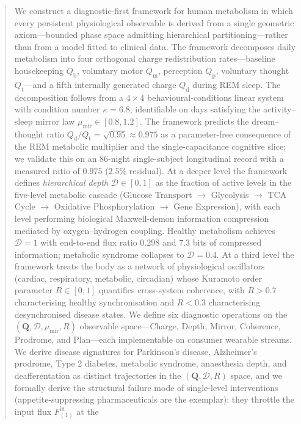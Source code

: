 \documentclass[11pt,twocolumn,a4paper]{article}
\theoremstyle{definition}
\theoremstyle{remark}
\newcommand{\Qb}{Q_{\mathrm{b}}}
\newcommand{\Qm}{Q_{\mathrm{m}}}
\newcommand{\Qp}{Q_{\mathrm{p}}}
\newcommand{\Qt}{Q_{\mathrm{t}}}
\newcommand{\Qd}{Q_{\mathrm{d}}}
\newcommand{\Dhier}{\mathcal{D}}
\newcommand{\Rcoh}{R}
\newcommand{\munir}{\mu_{\mathrm{mir}}}
\begin{document}
\begin{abstract}
We construct a diagnostic-first framework for human metabolism in which
every persistent physiological observable is derived from a single
geometric axiom---bounded phase space admitting hierarchical
partitioning---rather than from a model fitted to clinical data. The
framework decomposes daily metabolism into four orthogonal charge
redistribution rates---baseline housekeeping $\Qb$, voluntary motor
$\Qm$, perception $\Qp$, voluntary thought $\Qt$---and a fifth
internally generated charge $\Qd$ during REM sleep. The decomposition
follows from a $4 \times 4$ behavioural-conditions linear system with
condition number $\kappa = 6.8$, identifiable on days satisfying the
activity--sleep mirror law $\munir \in [0.8, 1.2]$. The framework
predicts the dream--thought ratio $\Qd/\Qt = \sqrt{0.95} \approx 0.975$
as a parameter-free consequence of the REM metabolic multiplier and
the single-capacitance cognitive slice; we validate this on an 86-night
single-subject longitudinal record with a measured ratio of $0.975$
($2.5\%$ residual). At a deeper level the framework defines
\emph{hierarchical depth} $\Dhier \in [0, 1]$ as the fraction of
active levels in the five-level metabolic cascade (Glucose Transport
$\to$ Glycolysis $\to$ TCA Cycle $\to$ Oxidative Phosphorylation $\to$
Gene Expression), with each level performing biological Maxwell-demon
information compression mediated by oxygen--hydrogen coupling. Healthy
metabolism achieves $\Dhier = 1$ with end-to-end flux ratio $0.298$
and $7.3$ bits of compressed information; metabolic syndrome collapses
to $\Dhier = 0.4$. At a third level the framework treats the body as
a network of physiological oscillators (cardiac, respiratory,
metabolic, circadian) whose Kuramoto order parameter $\Rcoh \in [0,1]$
quantifies cross-system coherence, with $\Rcoh > 0.7$ characterising
healthy synchronisation and $\Rcoh < 0.3$ characterising desynchronised
disease states. We define six diagnostic operations on the
$(\mathbf{Q}, \Dhier, \munir, \Rcoh)$ observable space---Charge,
Depth, Mirror, Coherence, Prodrome, and Plan---each implementable on
consumer wearable streams. We derive disease signatures for
Parkinson's disease, Alzheimer's prodrome, Type 2 diabetes, metabolic
syndrome, anaesthesia depth, and deafferentation as distinct
trajectories in the $(\mathbf{Q}, \Dhier, \Rcoh)$ space, and we
formally derive the structural failure mode of single-level
interventions (appetite-suppressing pharmaceuticals are the exemplar):
they throttle the input flux $F^{\mathrm{in}}_{(1)}$ at the

\end{abstract}
\end{document}
